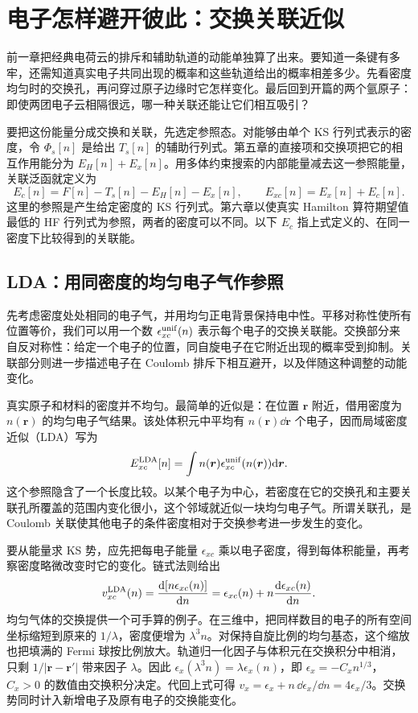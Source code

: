 \chapter{电子怎样避开彼此：交换关联近似}
前一章把经典电荷云的排斥和辅助轨道的动能单独算了出来。要知道一条键有多牢，还需知道真实电子共同出现的概率和这些轨道给出的概率相差多少。先看密度均匀时的交换孔，再问穿过原子边缘时它怎样变化。最后回到开篇的两个氩原子：即使两团电子云相隔很远，哪一种关联还能让它们相互吸引？

要把这份能量分成交换和关联，先选定参照态。对能够由单个 KS 行列式表示的密度，令 $\Phi_s[n]$ 是给出 $T_s[n]$ 的辅助行列式。第五章的直接项和交换项把它的相互作用能分为 $E_H[n]+E_x[n]$。用多体约束搜索的内部能量减去这一参照能量，关联泛函就定义为
\begin{equation}
E_c[n]=F[n]-T_s[n]-E_H[n]-E_x[n],\qquad E_{xc}[n]=E_x[n]+E_c[n].
\end{equation}
这里的参照是产生给定密度的 KS 行列式。第六章以使真实 Hamilton 算符期望值最低的 HF 行列式为参照，两者的密度可以不同。以下 $E_c$ 指上式定义的、在同一密度下比较得到的关联能。

\section{LDA：用同密度的均匀电子气作参照}
先考虑密度处处相同的电子气，并用均匀正电背景保持电中性。平移对称性使所有位置等价，我们可以用一个数 $\epsilon_{xc}^{\rm unif}(n)$ 表示每个电子的交换关联能。交换部分来自反对称性：给定一个电子的位置，同自旋电子在它附近出现的概率受到抑制。关联部分则进一步描述电子在 Coulomb 排斥下相互避开，以及伴随这种调整的动能变化。

真实原子和材料的密度并不均匀。最简单的近似是：在位置 $\bm r$ 附近，借用密度为 $n(\bm r)$ 的均匀电子气结果。该处体积元中平均有 $n(\bm r)\dd\bm r$ 个电子，因而局域密度近似（LDA）写为
\begin{equation}
E_{xc}^{\rm LDA}[n]=\int n(\bm r)\epsilon_{xc}^{\rm unif}(n(\bm r))\mathrm{d}\bm r.
\end{equation}
这个参照隐含了一个长度比较。以某个电子为中心，若密度在它的交换孔和主要关联孔所覆盖的范围内变化很小，这个邻域就近似一块均匀电子气。所谓关联孔，是 Coulomb 关联使其他电子的条件密度相对于交换参考进一步发生的变化。

要从能量求 KS 势，应先把每电子能量 $\epsilon_{xc}$ 乘以电子密度，得到每体积能量，再考察密度略微改变时它的变化。链式法则给出
\begin{equation}
v_{xc}^{\rm LDA}(n)=\frac{\mathrm{d}[n\epsilon_{xc}(n)]}{\mathrm{d} n}
=\epsilon_{xc}(n)+n\frac{\mathrm{d}\epsilon_{xc}(n)}{\mathrm{d} n}.
\end{equation}
均匀气体的交换提供一个可手算的例子。在三维中，把同样数目的电子的所有空间坐标缩短到原来的 $1/\lambda$，密度便增为 $\lambda^3 n$。对保持自旋比例的均匀基态，这个缩放也把填满的 Fermi 球按比例放大。轨道归一化因子与体积元在交换积分中相消，只剩 $1/|\bm r-\bm r'|$ 带来因子 $\lambda$。因此 $\epsilon_x(\lambda^3 n)=\lambda\epsilon_x(n)$，即 $\epsilon_x=-C_x n^{1/3}$，$C_x>0$ 的数值由交换积分决定。代回上式可得 $v_x=\epsilon_x+n\,\dd\epsilon_x/\dd n=4\epsilon_x/3$。交换势同时计入新增电子及原有电子的交换能变化。

